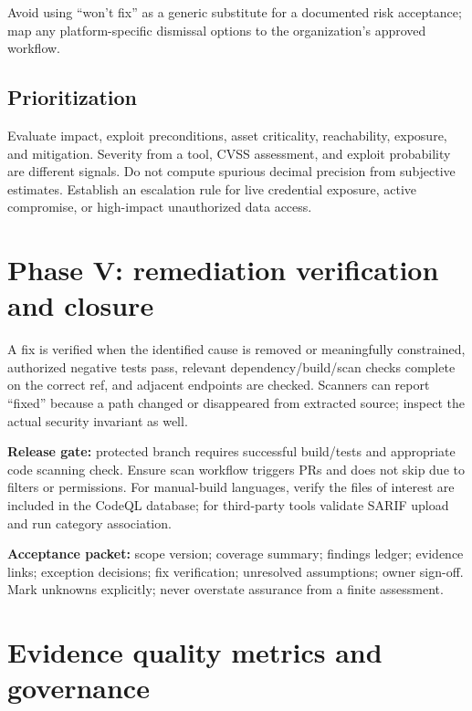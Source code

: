 \documentclass[
  letterpaper,
]{article}
\begin{document}
Avoid using ``won't fix'' as a generic substitute for a documented risk
acceptance; map any platform-specific dismissal options to the
organization's approved workflow.

\subsection{Prioritization}\label{prioritization}

Evaluate impact, exploit preconditions, asset criticality, reachability,
exposure, and mitigation. Severity from a tool, CVSS assessment, and
exploit probability are different signals. Do not compute spurious
decimal precision from subjective estimates. Establish an escalation
rule for live credential exposure, active compromise, or high-impact
unauthorized data access.

\section{Phase V: remediation verification and
closure}\label{phase-v-remediation-verification-and-closure}

A fix is verified when the identified cause is removed or meaningfully
constrained, authorized negative tests pass, relevant
dependency/build/scan checks complete on the correct ref, and adjacent
endpoints are checked. Scanners can report ``fixed'' because a path
changed or disappeared from extracted source; inspect the actual
security invariant as well.

\textbf{Release gate:} protected branch requires successful build/tests
and appropriate code scanning check. Ensure scan workflow triggers PRs
and does not skip due to filters or permissions. For manual-build
languages, verify the files of interest are included in the CodeQL
database; for third-party tools validate SARIF upload and run category
association.

\textbf{Acceptance packet:} scope version; coverage summary; findings
ledger; evidence links; exception decisions; fix verification;
unresolved assumptions; owner sign-off. Mark unknowns explicitly; never
overstate assurance from a finite assessment.

\section{Evidence quality metrics and
governance}\label{evidence-quality-metrics-and-governance}
\end{document}
